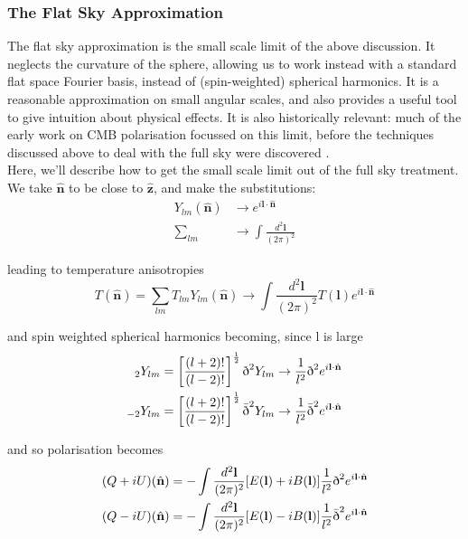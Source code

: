 \documentclass[a4paper,10pt]{article}
\renewcommand{\v}[1]{\mathbf{#1}}
\newcommand{\half}{\frac{1}{2}}
\newcommand{\finttwo}[1]{\int \frac{d^2 \v{#1}}{(2\pi)^2}}
\newcommand{\unit}[1]{\hat{\v{#1}}}
\newcommand{\sr}{\text{\normalfont\dh}}
\renewcommand{\sl}{\bar{\text{\normalfont\dh}}}
\newcommand{\ltwo}{\left[\frac{(l+2)!}{(l-2)!}\right]}
\begin{document}
\subsubsection{The Flat Sky Approximation}

The flat sky approximation is the small scale limit of the above discussion. It neglects the curvature of the sphere, allowing us to work instead with a standard flat space Fourier basis, instead of (spin-weighted) spherical harmonics. It is a reasonable approximation on small angular scales, and also provides a useful tool to give intuition about physical effects. It is also historically relevant: much of the early work on CMB polarisation focussed on this limit, before the techniques discussed above to deal with the full sky were discovered \cite{all-sky}.\\

Here, we'll describe how to get the small scale limit out of the full sky treatment.  We take $\unit{n}$ to be close to $\unit{z}$, and make the substitutions:
\begin{equation}
\begin{split}
Y_{lm}(\unit{n}) &\rightarrow e^{i\v{l}\cdot\unit{n}}\\
\sum_{lm} &\rightarrow \finttwo{l}
\end{split}
\end{equation}

leading to temperature anisotropies
\begin{equation}
T(\unit{n}) = \sum_{lm} T_{lm}Y_{lm}(\unit{n})\rightarrow \finttwo{l} T(\v{l})e^{i\v{l}\cdot\unit{n}}
\end{equation}

and spin weighted spherical harmonics becoming, since l is large 
\begin{equation}\begin{split}
{}_2Y_{lm} &= \ltwo^\half\sr^2Y_{lm} \rightarrow \frac{1}{l^2}\sr^2e^{i\v{l}\cdot\unit{n}}\\
{}_{-2}Y_{lm} &= \ltwo^\half\sl^2Y_{lm} \rightarrow  \frac{1}{l^2}\sl^2e^{i\v{l}\cdot\unit{n}}
\end{split}\end{equation}

and so polarisation becomes
\begin{equation}\begin{split}
(Q+iU)(\unit{n}) &= -\finttwo{l} [E(\v{l})+iB(\v{l})]  \frac{1}{l^2}\sr^2e^{i\v{l}\cdot\unit{n}}\\
(Q-iU)(\unit{n}) &= -\finttwo{l} [E(\v{l})-iB(\v{l})] \frac{1}{l^2}\sl^2e^{i\v{l}\cdot\unit{n}}
\end{split}\end{equation}
\end{document}
